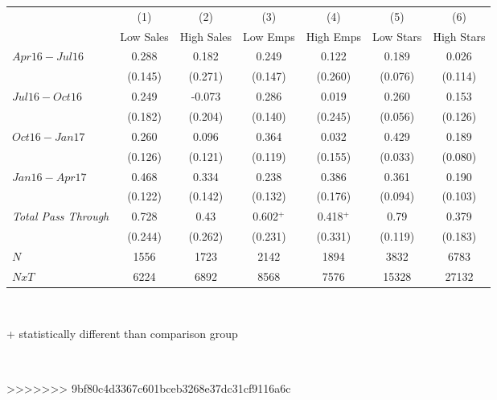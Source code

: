 \begin{center}
\begin{tabular}{lcccccc}
\hline  & (1) & (2) & (3) & (4) & (5) & (6)\\
 & Low Sales & High Sales & Low Emps & High Emps & Low Stars & High Stars\\
\hline  $ Apr16-Jul16 $  & 0.288 & 0.182 & 0.249 & 0.122 & 0.189 & 0.026\\
 & (0.145) & (0.271) & (0.147) & (0.260) & (0.076) & (0.114)\\
 $ Jul16-Oct16 $  & 0.249 & -0.073 & 0.286 & 0.019 & 0.260 & 0.153\\
 & (0.182) & (0.204) & (0.140) & (0.245) & (0.056) & (0.126)\\
 $ Oct16-Jan17 $  & 0.260 & 0.096 & 0.364 & 0.032 & 0.429 & 0.189\\
 & (0.126) & (0.121) & (0.119) & (0.155) & (0.033) & (0.080)\\
 $ Jan16-Apr17 $  & 0.468 & 0.334 & 0.238 & 0.386 & 0.361 & 0.190\\
 & (0.122) & (0.142) & (0.132) & (0.176) & (0.094) & (0.103)\\
\hline \textit{Total Pass Through} & 0.728 & 0.43 & 0.602$^+$ & 0.418$^+$ & 0.79 & 0.379\\
  & (0.244) & (0.262) & (0.231) & (0.331) & (0.119) & (0.183)\\
\hline  $ N $  & 1556 & 1723 & 2142 & 1894 & 3832 & 6783\\
 $ NxT $  & 6224 & 6892 & 8568 & 7576 & 15328 & 27132\\
\hline\end{tabular}\\
\begin{tiny} + statistically different than comparison group \end{tiny}\\
\end{center}
>>>>>>> 9bf80c4d3367c601bceb3268e37dc31cf9116a6c
